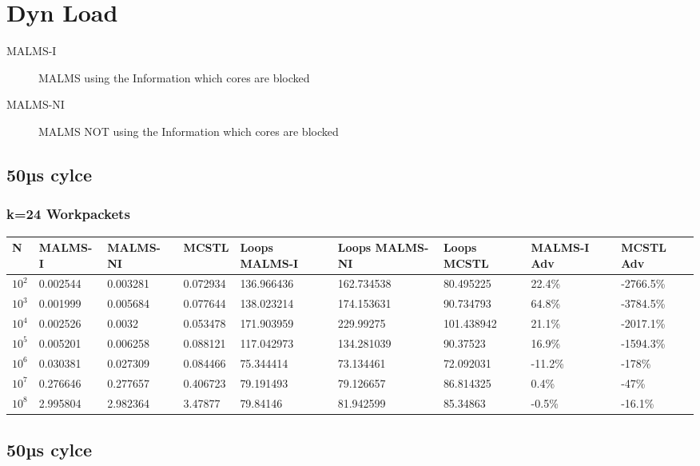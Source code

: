 \documentclass[landscape]{article}
\begin{document}
\section{Dyn Load}
\begin{description}
	\item[MALMS-I] MALMS using the Information which cores are blocked
	\item[MALMS-NI] MALMS NOT using the Information which cores are blocked
\end{description}


\subsection*{50µs cylce}
\subsubsection{k=24 Workpackets}
\begin{tabular}{l|l|l|l|l|l|l|l|l}
N	& MALMS-I 	& MALMS-NI	& MCSTL		& Loops MALMS-I	& Loops MALMS-NI & Loops MCSTL & MALMS-I Adv	& MCSTL Adv		\\
\hline
$10^2$		& 0.002544	& 0.003281	& 0.072934	& 136.966436	& 162.734538	& 80.495225	& 22.4\%  	& -2766.5\% \\
$10^3$		& 0.001999	& 0.005684	& 0.077644	& 138.023214	& 174.153631	& 90.734793	& 64.8\%  	& -3784.5\% \\
$10^4$		& 0.002526	& 0.0032	& 0.053478	& 171.903959	& 229.99275	& 101.438942	& 21.1\%  	& -2017.1\% \\
$10^5$		& 0.005201	& 0.006258	& 0.088121	& 117.042973	& 134.281039	& 90.37523	& 16.9\%  	& -1594.3\% \\
$10^6$		& 0.030381	& 0.027309	& 0.084466	& 75.344414	& 73.134461	& 72.092031	& -11.2\%  	& -178\% \\
$10^7$		& 0.276646	& 0.277657	& 0.406723	& 79.191493	& 79.126657	& 86.814325	& 0.4\%  	& -47\% \\
$10^8$		& 2.995804	& 2.982364	& 3.47877	& 79.84146	& 81.942599	& 85.34863	& -0.5\%  	& -16.1\% \\
\end{tabular}
\subsection*{50µs cylce}
\end{document}
